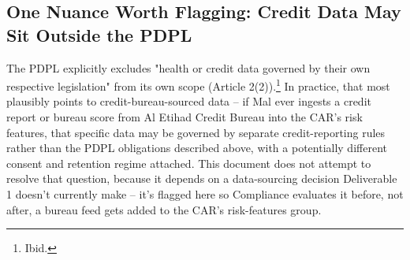 \documentclass[11pt]{article}
\begin{document}
\subsection{One Nuance Worth Flagging: Credit Data May Sit Outside the PDPL}
\begin{rationale}
The PDPL explicitly excludes "health or credit data governed by their own respective legislation" from its own scope (Article 2(2)).\footnote{Ibid.} In practice, that most plausibly points to credit-bureau-sourced data -- if Mal ever ingests a credit report or bureau score from Al Etihad Credit Bureau into the CAR's risk features, that specific data may be governed by separate credit-reporting rules rather than the PDPL obligations described above, with a potentially different consent and retention regime attached. This document does not attempt to resolve that question, because it depends on a data-sourcing decision Deliverable 1 doesn't currently make -- it's flagged here so Compliance evaluates it before, not after, a bureau feed gets added to the CAR's risk-features group.
\end{rationale}
\end{document}
